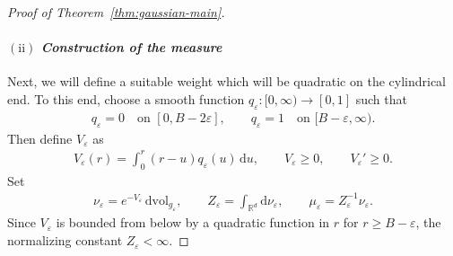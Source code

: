 \documentclass[11pt,reqno]{amsart}
\numberwithin{equation}{section}
\theoremstyle{definition}
\theoremstyle{remark}
\newcommand{\ud}{\mathrm{d}}
\newcommand{\0}{\emptyset}
\newcommand{\veps}{\varepsilon}
\newcommand{\bbR}{\mathbb R}
\newcommand{\dvol}{\,\mathrm{dvol}}
\begin{document}
\begin{proof}[Proof of Theorem~\ref{thm:gaussian-main}]
\paragraph{$\mathrm{(ii)}$ \textit{Construction of the measure}} Next, we will define a suitable weight which will be quadratic on the cylindrical end. To this end, choose a smooth function \(q_\veps:[0,\infty)\to[0,1]\) such
that
\begin{align}
        q_\veps=0\quad\text{on }[0,B-2\veps],
        \qquad
        q_\veps=1\quad\text{on }[B-\veps,\infty).
\end{align}
Then define \(V_\veps\) as
\begin{align}
        V_\veps(r)=\int_0^r(r-u)q_\veps(u)\,\ud u,
        \qquad
        V_\veps\geq0,
        \qquad
        V_\veps'\geq0.
\end{align}
Set
\begin{align}
        \nu_\veps=e^{-V_\veps}\dvol_{g_\veps},
        \qquad
        Z_\veps=\int_{\bbR^d}\ud\nu_\veps,
        \qquad
        \mu_\veps=Z_\veps^{-1}\nu_\veps.
\end{align}
Since \(V_\veps\) is bounded from below by a quadratic function in \(r\) for
\(r\geq B-\veps\), the normalizing constant \(Z_\veps<\infty\).


\end{proof}
\end{document}
